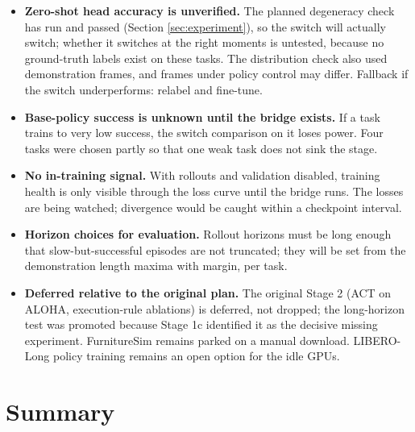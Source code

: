 \documentclass[11pt]{article}
\begin{document}
\begin{itemize}[leftmargin=2em]
  \item \textbf{Zero-shot head accuracy is unverified.} The planned
        degeneracy check has run and passed (Section \ref{sec:experiment}),
        so the switch will actually switch; whether it switches at the right
        moments is untested, because no ground-truth labels exist on these
        tasks. The distribution check also used demonstration frames, and
        frames under policy control may differ. Fallback if the switch
        underperforms: relabel and fine-tune.
  \item \textbf{Base-policy success is unknown until the bridge exists.} If a
        task trains to very low success, the switch comparison on it loses
        power. Four tasks were chosen partly so that one weak task does not
        sink the stage.
  \item \textbf{No in-training signal.} With rollouts and validation disabled,
        training health is only visible through the loss curve until the bridge
        runs. The losses are being watched; divergence would be caught within a
        checkpoint interval.
  \item \textbf{Horizon choices for evaluation.} Rollout horizons must be long
        enough that slow-but-successful episodes are not truncated; they will
        be set from the demonstration length maxima with margin, per task.
  \item \textbf{Deferred relative to the original plan.} The original Stage 2
        (ACT on ALOHA, execution-rule ablations) is deferred, not dropped; the
        long-horizon test was promoted because Stage 1c identified it as the
        decisive missing experiment. FurnitureSim remains parked on a manual
        download. LIBERO-Long policy training remains an open option for the
        idle GPUs.
\end{itemize}

\section{Summary}
\end{document}
